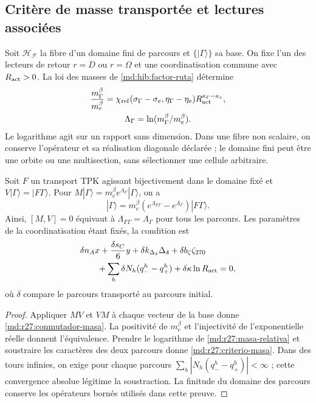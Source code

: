 \subsection{Critère de masse transportée et lectures associées}
Soit $\mathcal H_{\mathcal F}$ la fibre d'un domaine fini de parcours et $\{|\Gamma\rangle\}$ sa base. On fixe l'un des lecteurs de retour $r=D$ ou $r=\Omega$ et une coordinatisation commune avec $R_{\rm act}>0$. La loi des masses de \eqref{md:hib:factor-ruta} détermine
\begin{equation}
 \begin{gathered}
 \frac{m_\Gamma^\beta}{m_e^\beta}
 =\chi_{\rm ref}(\sigma_\Gamma-\sigma_e,\eta_\Gamma-\eta_e)
 R_{\rm act}^{\kappa_\Gamma-\kappa_e},\\
 \Lambda_\Gamma=\ln(m_\Gamma^\beta/m_e^\beta).
 \end{gathered}
 \label{md:r27:masa-relativa}
\end{equation}
Le logarithme agit sur un rapport sans dimension. Dans une fibre non scalaire, on conserve l'opérateur et sa réalisation diagonale déclarée ; le domaine fini peut être une orbite ou une multisection, sans sélectionner une cellule arbitraire.

\begin{theorem}
Soit $F$ un transport TPK agissant bijectivement dans le domaine fixé et $V|\Gamma\rangle=|F\Gamma\rangle$. Pour $M|\Gamma\rangle=m_e^\beta e^{\Lambda_\Gamma}|\Gamma\rangle$, on a
\begin{equation}
 [M,V]|\Gamma\rangle=m_e^\beta
 (e^{\Lambda_{F\Gamma}}-e^{\Lambda_\Gamma})|F\Gamma\rangle.
 \label{md:r27:conmutador-masa}
\end{equation}
Ainsi, $[M,V]=0$ équivaut à $\Lambda_{F\Gamma}=\Lambda_\Gamma$ pour tous les parcours. Les paramètres de la coordinatisation étant fixés, la condition est
\begin{equation}
 \begin{aligned}
 &\delta n_A x+\frac{\delta s_C}{6}y+
 \delta k_{\Delta_4}\Delta_4+\delta b_\zeta\zeta_{270}\\
 &\qquad+\sum_h\delta N_h(q_-^h-q_+^h)
 +\delta\kappa\ln R_{\rm act}=0,
 \end{aligned}
 \label{md:r27:criterio-masa}
\end{equation}
où $\delta$ compare le parcours transporté au parcours initial.
\end{theorem}
\begin{proof}
Appliquer $MV$ et $VM$ à chaque vecteur de la base donne \eqref{md:r27:conmutador-masa}. La positivité de $m_e^\beta$ et l'injectivité de l'exponentielle réelle donnent l'équivalence. Prendre le logarithme de \eqref{md:r27:masa-relativa} et soustraire les caractères des deux parcours donne \eqref{md:r27:criterio-masa}. Dans des tours infinies, on exige pour chaque parcours $\sum_h|N_h(q_-^h-q_+^h)|<\infty$ ; cette convergence absolue légitime la soustraction. La finitude du domaine des parcours conserve les opérateurs bornés utilisés dans cette preuve.
\end{proof}

